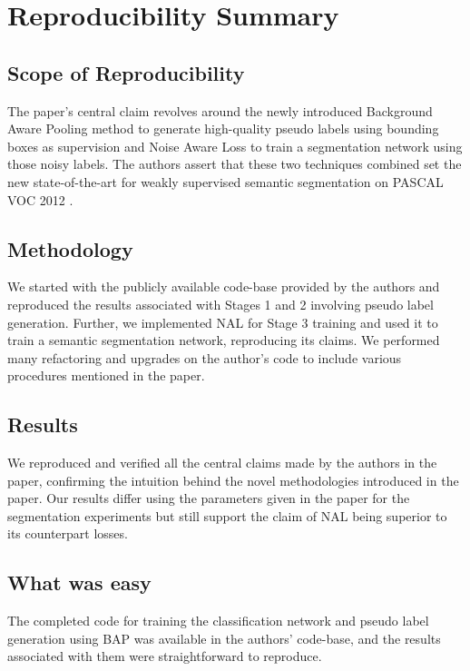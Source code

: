 \section*{Reproducibility Summary}

\subsection*{Scope of Reproducibility}

The paper's central claim revolves around the newly introduced Background Aware Pooling method to generate high-quality pseudo labels using bounding boxes as supervision and Noise Aware Loss to train a segmentation network using those noisy labels. The authors assert that these two techniques combined set the new state-of-the-art for weakly supervised semantic segmentation on PASCAL VOC 2012 \cite{pascal}. 

\subsection*{Methodology}

We started with the publicly available code-base provided by the authors and reproduced the results associated with Stages 1 and 2 involving pseudo label generation. Further, we implemented NAL for Stage 3 training and used it to train a semantic segmentation network, reproducing its claims. We performed many refactoring and upgrades on the author's code to include various procedures mentioned in the paper.

\subsection*{Results}

We reproduced and verified all the central claims made by the authors in the paper, confirming the intuition behind the novel methodologies introduced in the paper. Our results differ using the parameters given in the paper for the segmentation experiments but still support the claim of NAL being superior to its counterpart losses.

\subsection*{What was easy}
The completed code for training the classification network and pseudo label generation using BAP was available in the authors' code-base, and the results associated with them were straightforward to reproduce. 

